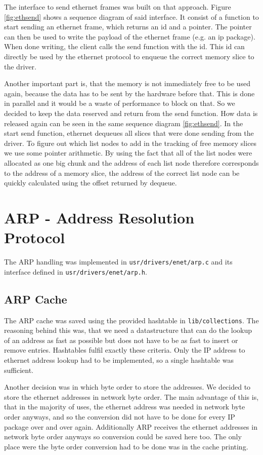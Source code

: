 The interface to send ethernet frames was built on that approach. Figure \ref{fig:ethsend} shows a sequence diagram of said interface. It consist of a function to start sending an ethernet frame, which returns an id and a pointer. The pointer can then be used to write the payload of the ethernet frame (e.g. an ip package). When done writing, the client calls the send function with the id. This id can directly be used by the ethernet protocol to enqueue the correct memory slice to the driver.

Another important part is, that the memory is not immediately free to be used again, because the data has to be sent by the hardware before that. This is done in parallel and it would be a waste of performance to block on that. So we decided to keep the data reserved and return from the send function. How data is released again can be seen in the same sequence diagram \ref{fig:ethsend}. In the start send function, ethernet dequeues all slices that were done sending from the driver. To figure out which list nodes to add in the tracking of free memory slices we use some pointer arithmetic. By using the fact that all of the list nodes were allocated as one big chunk and the address of each list node therefore corresponds to the address of a memory slice, the address of the correct list node can be quickly calculated using the offset returned by dequeue.

\section{ARP - Address Resolution Protocol}
The ARP handling was implemented in \verb|usr/drivers/enet/arp.c| and its interface defined in \verb|usr/drivers/enet/arp.h|.

\subsection{ARP Cache}
\label{sec:arpcache}
The ARP cache was saved using the provided hashtable in \verb|lib/collections|. The reasoning behind this was, that we need a datastructure that can do the lookup of an address as fast as possible but does not have to be as fast to insert or remove entries. Hashtables fulfil exactly these criteria. Only the IP address to ethernet address lookup had to be implemented, so a single hashtable was sufficient.

Another decision was in which byte order to store the addresses. We decided to store the ethernet addresses in network byte order. The main advantage of this is, that in the majority of uses, the ethernet address was needed in network byte order anyways, and so the conversion did not have to be done for every IP package over and over again. Additionally ARP receives the ethernet addresses in network byte order anyways so conversion could be saved here too. The only place were the byte order conversion had to be done was in the cache printing.

